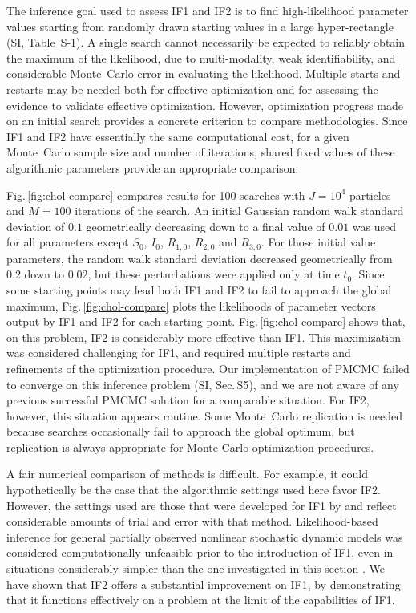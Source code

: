 \documentclass{pnastwo}\usepackage[]{graphicx}\usepackage[]{color}
\newcommand\secPMCMC{S5}
\newcommand\mySection{{Sec.$\,$}}
\newcommand\myFigure{{Fig.$\,$}}
\begin{document}
\begin{article}
The inference goal used to assess IF1 and IF2 is to find high-likelihood parameter values starting from randomly drawn starting values in a large hyper-rectangle (SI, Table~S-1). 
A single search cannot necessarily be expected to reliably obtain the maximum of the likelihood, due to multi-modality, weak identifiability, and considerable Monte~Carlo error in evaluating the likelihood.
Multiple starts and restarts may be needed both for effective optimization and for assessing the evidence to validate effective optimization.
However, optimization progress made on an initial search provides a concrete criterion to compare methodologies.
Since IF1 and IF2 have essentially the same computational cost, for a given Monte~Carlo sample size and number of iterations, shared fixed values of these algorithmic parameters provide an appropriate comparison.
 


{\myFigure}\ref{fig:chol-compare} compares results for 100 searches with $J=10^4$ particles and $M=100$ iterations of the search. 
An initial Gaussian random walk standard deviation of $0.1$ geometrically decreasing down to a final value of $0.01$ was used for all parameters except $S_0$, $I_0$, $R_{1,0}$, $R_{2,0}$ and  $R_{3,0}$.
For those initial value parameters, the random walk standard deviation decreased geometrically from $0.2$ down to $0.02$, but these perturbations were applied only at time $t_0$. 
Since some starting points may lead both IF1 and IF2 to fail to approach the global maximum, {\myFigure}\ref{fig:chol-compare} plots the likelihoods of parameter vectors output by IF1 and IF2 for each starting point.
{\myFigure}\ref{fig:chol-compare} shows that, on this problem, IF2 is considerably more effective than IF1. 
This maximization was considered challenging for IF1, and \cite{king08} required multiple restarts and refinements of the optimization procedure. 
Our implementation of PMCMC failed to converge on this inference problem (SI, {\mySection}{\secPMCMC}), and we are not aware of any previous successful PMCMC solution for a comparable situation. 
For IF2, however, this situation appears routine.
Some Monte~Carlo replication is needed because  searches occasionally fail to approach the global optimum, but replication is always appropriate for Monte Carlo optimization procedures.


A fair numerical comparison of methods is difficult. 
For example, it could hypothetically be the case that the algorithmic settings used here favor IF2. 
However, the settings used are those that were developed for IF1 by \cite{king08} and reflect considerable amounts of trial and error with that method.
Likelihood-based inference for general partially observed nonlinear stochastic dynamic models was considered computationally unfeasible prior to the introduction of IF1, even in situations considerably simpler than the one investigated in this section \cite{wood10}.
We have shown that IF2 offers a substantial improvement on IF1, by demonstrating that it functions effectively on a problem at the limit of the capabilities of IF1.


\end{article}
\end{document}
